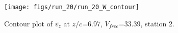 \begin{figure}[H]
\centering
\texttt{[image: figs/run\_20/run\_20\_W\_contour]}
\caption{Contour plot of $\overline{v_{z}}$ at $z/c$=6.97, $V_{free}$=33.39, station 2.}
\label{fig:run_20_W_contour}
\end{figure}


